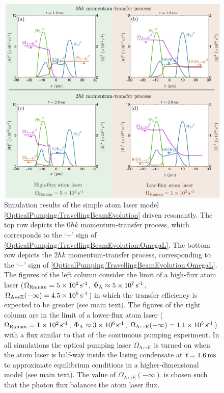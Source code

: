 \begin{figure}
    \centering
    \includegraphics[width=15cm]{TravellingBeamZeroDetuningResults}
    \caption{Simulation results of the simple atom laser model \eqref{OpticalPumping:TravellingBeamEvolution} driven resonantly.  
    The top row depicts the $0\hbar k$ momentum-transfer process, which corresponds to the `$+$' sign of \eqref{OpticalPumping:TravellingBeamEvolution:OmegaL}.  
    The bottom row depicts the $2\hbar k$ momentum-transfer process, corresponding to the `$-$' sign of \eqref{OpticalPumping:TravellingBeamEvolution:OmegaL}.  
    The figures of the left column consider the limit of a high-flux atom laser ($\Omega_\text{Raman} = 5 \times\unit[10^2]{s\textsuperscript{-1}}$, $\Phi_\text{A} \approx 5 \times \unit[10^7]{s\textsuperscript{-1}}$, $\Omega_{\text{A}\leftrightarrow\text{E}}(-\infty) = 4.5\times \unit[10^5]{s\textsuperscript{-1}}$) in which the transfer efficiency is expected to be greater (see main text).  
    The figures of the right column are in the limit of a lower-flux atom laser ($\Omega_\text{Raman} = 1 \times \unit[10^2]{s\textsuperscript{-1}}$, $\Phi_\text{A} \approx 3\times \unit[10^6]{s\textsuperscript{-1}}$, $\Omega_{\text{A}\leftrightarrow\text{E}}(-\infty) = 1.1\times\unit[10^5]{s\textsuperscript{-1}}$) with a flux similar to that of the continuous pumping experiment.  
    In all simulations the optical pumping laser $\Omega_{\text{A}\leftrightarrow\text{E}}$ is turned on when the atom laser is half-way inside the lasing condensate at $t=\unit[1.6]{ms}$ to approximate equilibrium conditions in a higher-dimensional model (see main text).  The value of $\Omega_{\text{A} \leftrightarrow \text{E}}(-\infty)$ is chosen such that the photon flux balances the atom laser flux.
}
\end{figure}

